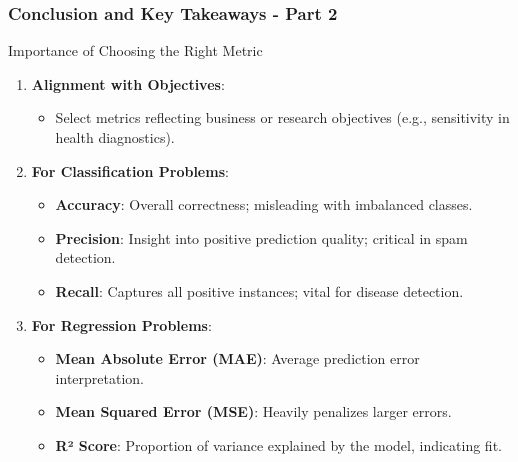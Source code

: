 \documentclass[aspectratio=169]{beamer}
\begin{document}
\begin{frame}[fragile]
  \frametitle{Conclusion and Key Takeaways - Part 2}

  \begin{block}{Importance of Choosing the Right Metric}
    \begin{enumerate}
      \item \textbf{Alignment with Objectives}:
        \begin{itemize}
          \item Select metrics reflecting business or research objectives (e.g., sensitivity in health diagnostics).
        \end{itemize}
        
      \item \textbf{For Classification Problems}:
        \begin{itemize}
          \item \textbf{Accuracy}: Overall correctness; misleading with imbalanced classes.
          \item \textbf{Precision}: Insight into positive prediction quality; critical in spam detection.
          \item \textbf{Recall}: Captures all positive instances; vital for disease detection.
        \end{itemize}
        
      \item \textbf{For Regression Problems}:
        \begin{itemize}
          \item \textbf{Mean Absolute Error (MAE)}: Average prediction error interpretation.
          \item \textbf{Mean Squared Error (MSE)}: Heavily penalizes larger errors.
          \item \textbf{R² Score}: Proportion of variance explained by the model, indicating fit.
        \end{itemize}
    \end{enumerate}
  \end{block}
\end{frame}
\end{document}
